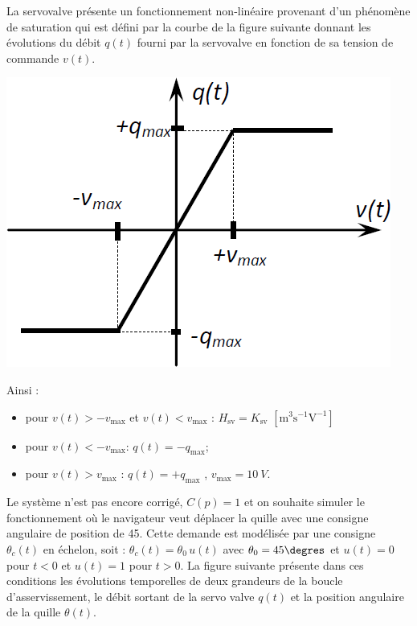 \documentclass[10pt,fleqn]{article} %
\begin{document}
\begin{multicols}{2}
\ifprof
\else
La servovalve présente un fonctionnement non-linéaire provenant
d’un phénomène de saturation qui est défini par la courbe de la
figure suivante donnant les évolutions du débit $q(t)$ fourni par la
servovalve en fonction de sa tension de commande $v(t)$.
\begin{center}
\includegraphics[width=.5\linewidth]{images/fig_04}

\end{center}

Ainsi :
\begin{itemize}
\item pour $v(t) > -v_{\text{max}}$ et $v(t) < v_{\text{max}}$ : $H_{\text{sv}} = K_{\text{sv}}$ $\left[\text{m}^3 \text{s}^{-1}\text{V}^{-1}\right]$
\item pour $v(t) < -v_{\text{max}}$: $q(t) = -q_{\text{max}}$;
\item pour $v(t) > v_{\text{max}}$ : $q(t) = +q_{\text{max}}$ , $v_{\text{max}} = \SI{10}{V}$.
\end{itemize}
Le système n’est pas encore corrigé, $C(p) =1$ et on souhaite simuler
le fonctionnement où le navigateur veut déplacer la quille avec une
consigne angulaire de position de 45\degres. Cette demande est modélisée
par une consigne $\theta_c(t)$ en échelon, soit : $\theta_c(t)=\theta_0\,u(t)$ avec $\theta_0=45\degres$ et
$u(t) = 0$ pour $t < 0$ et $u(t) = 1$ pour $t > 0$. La figure suivante présente dans ces conditions les évolutions temporelles de deux grandeurs de la boucle d’asservissement, le débit sortant de la servo valve
$q(t)$ et la position angulaire de la quille $\theta(t)$.


\end{multicols}
\end{document}
